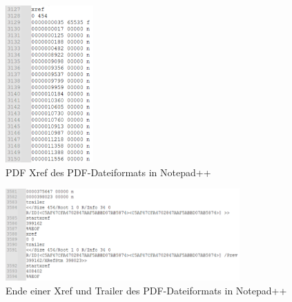 \begin{figure}[!htb]
	\centering
	\includegraphics[width=0.3\textwidth]{"images/pdf_xref_start-notepad.png"}
	\caption{PDF Xref des PDF-Dateiformats in Notepad++}
	\label{fig:xref}
\end{figure}

\begin{figure}[!htb]
	\centering
	\includegraphics[width=0.8\textwidth]{"images/pdf_trailer2-notepad.png"}
	\caption{Ende einer Xref und Trailer des PDF-Dateiformats in Notepad++}
	\label{fig:trailer2}
\end{figure}

